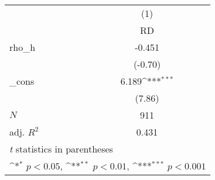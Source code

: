 {
\def\sym#1{\ifmmode^{#1}\else\(^{#1}\)\fi}
\begin{tabular}{l*{1}{c}}
\toprule
            &\multicolumn{1}{c}{(1)}\\
            &\multicolumn{1}{c}{RD}\\
\midrule
rho\_h       &      -0.451         \\
            &     (-0.70)         \\
\addlinespace
\_cons      &       6.189\sym{***}\\
            &      (7.86)         \\
\midrule
\(N\)       &         911         \\
adj. \(R^{2}\)&       0.431         \\
\bottomrule
\multicolumn{2}{l}{\footnotesize \textit{t} statistics in parentheses}\\
\multicolumn{2}{l}{\footnotesize \sym{*} \(p<0.05\), \sym{**} \(p<0.01\), \sym{***} \(p<0.001\)}\\
\end{tabular}
}
